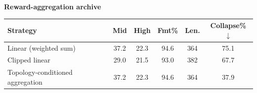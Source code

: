 \begin{center}
\vspace{5pt}
\textbf{Reward-aggregation archive}\par\vspace{2pt}
\begin{tabular}{@{}lccccc@{}}
\toprule
\textbf{Strategy} & \textbf{Mid} & \textbf{High} & \textbf{Fmt\%} & \textbf{Len.} & \textbf{Collapse\%}$\downarrow$ \\
\midrule
Linear (weighted sum) & 37.2 & 22.3 & 94.6 & 364 & 75.1 \\
Clipped linear & 29.0 & 21.5 & 93.0 & 382 & 67.7 \\
\rowcolor{blue!6} Topology-conditioned aggregation & 37.2 & 22.3 & 94.6 & 364 & 37.9 \\
\bottomrule
\end{tabular}
\end{center}
